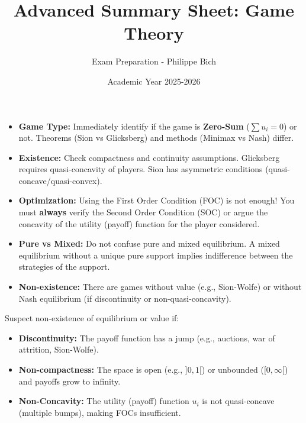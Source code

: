 \documentclass[10pt,a4paper]{article}
\title{\textbf{Advanced Summary Sheet: Game Theory}}
\author{Exam Preparation - Philippe Bich}
\date{Academic Year 2025-2026}
\begin{document}
\maketitle

\begin{tcolorbox}[colback=red!5,colframe=myred,title=\textbf{Strategic Tips \& Dangers (Read First!)}]
\begin{itemize}[leftmargin=*]
    \item \textbf{Game Type:} Immediately identify if the game is \textbf{Zero-Sum} ($\sum u_i = 0$) or not. Theorems (Sion vs Glicksberg) and methods (Minimax vs Nash) differ.
    \item \textbf{Existence:} Check compactness and continuity assumptions. Glicksberg requires quasi-concavity of players. Sion has asymmetric conditions (quasi-concave/quasi-convex).
    \item \textbf{Optimization:} Using the First Order Condition (FOC) is not enough! You must \textbf{always} verify the Second Order Condition (SOC) or argue the concavity of the utility (payoff) function for the player considered.
    \item \textbf{Pure vs Mixed:} Do not confuse pure and mixed equilibrium. A mixed equilibrium without a unique pure support implies indifference between the strategies of the support.
    \item \textbf{Non-existence:} There are games without value (e.g., Sion-Wolfe) or without Nash equilibrium (if discontinuity or non-quasi-concavity).
\end{itemize}
\begin{tcolorbox}[colback=orange!10,title=Methodology: Detecting Non-Existence]
Suspect non-existence of equilibrium or value if:
\begin{itemize}
    \item \textbf{Discontinuity:} The payoff function has a jump (e.g., auctions, war of attrition, Sion-Wolfe).
    \item \textbf{Non-compactness:} The space is open (e.g., $]0,1[$) or unbounded ($[0, \infty[$) and payoffs grow to infinity.
    \item \textbf{Non-Concavity:} The utility (payoff) function $u_i$ is not quasi-concave (multiple bumps), making FOCs insufficient.
\end{itemize}
\end{tcolorbox}
\end{tcolorbox}
\end{document}
